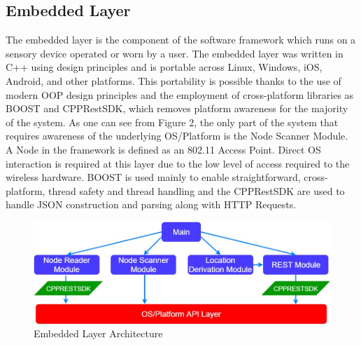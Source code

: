 \documentclass[conference]{IEEEtran}
\begin{document}
\subsection{Embedded Layer}
The embedded layer is the component of the software framework which runs on a sensory device operated or worn by a user. The embedded layer was written in C++ using design principles and is portable across Linux, Windows, iOS, Android, and other platforms. This portability is possible thanks to the use of modern OOP design principles and the employment of cross-platform libraries as BOOST and CPPRestSDK, which removes platform awareness for the majority of the system. As one can see from Figure 2, the only part of the system that requires awareness of the underlying OS/Platform is the Node Scanner Module. A Node in the framework is defined as an 802.11 Access Point. Direct OS interaction is required at this layer due to the low level of access required to the wireless hardware.
BOOST is used mainly to enable straightforward, cross-platform, thread safety and thread handling and the CPPRestSDK are used to handle JSON construction and parsing along with HTTP Requests.
\begin{figure}[H]
    \includegraphics[width=9 cm,height=3.5 cm]{Pink_Panther_Architecture.jpg}
    \caption{Embedded Layer Architecture}
    \end{figure}
\end{document}
